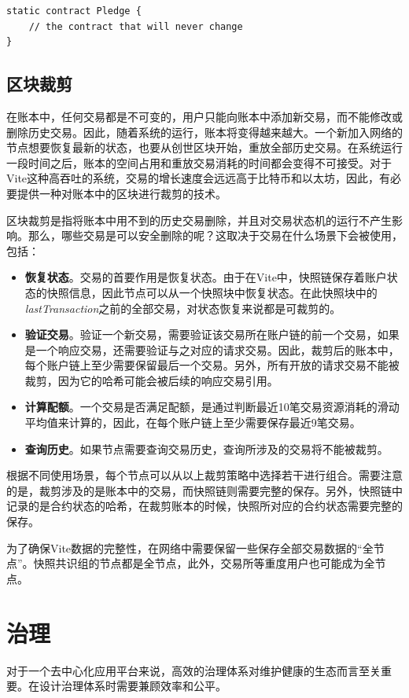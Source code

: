 \documentclass[UTF8,nofonts]{ctexart}
\begin{document}
\begin{multicols}{2}
\begin{verbatim}
static contract Pledge {
    // the contract that will never change
}
\end{verbatim}

\subsection{区块裁剪}
在账本中，任何交易都是不可变的，用户只能向账本中添加新交易，而不能修改或删除历史交易。因此，随着系统的运行，账本将变得越来越大。一个新加入网络的节点想要恢复最新的状态，也要从创世区块开始，重放全部历史交易。在系统运行一段时间之后，账本的空间占用和重放交易消耗的时间都会变得不可接受。对于Vite这种高吞吐的系统，交易的增长速度会远远高于比特币和以太坊，因此，有必要提供一种对账本中的区块进行裁剪的技术。

区块裁剪是指将账本中用不到的历史交易删除，并且对交易状态机的运行不产生影响。那么，哪些交易是可以安全删除的呢？这取决于交易在什么场景下会被使用，包括：

\begin{itemize}
\item \textbf{恢复状态}。交易的首要作用是恢复状态。由于在Vite中，快照链保存着账户状态的快照信息，因此节点可以从一个快照块中恢复状态。在此快照块中的\textit{lastTransaction}之前的全部交易，对状态恢复来说都是可裁剪的。
\item \textbf{验证交易}。验证一个新交易，需要验证该交易所在账户链的前一个交易，如果是一个响应交易，还需要验证与之对应的请求交易。因此，裁剪后的账本中，每个账户链上至少需要保留最后一个交易。另外，所有开放的请求交易不能被裁剪，因为它的哈希可能会被后续的响应交易引用。
\item \textbf{计算配额}。一个交易是否满足配额，是通过判断最近10笔交易资源消耗的滑动平均值来计算的，因此，在每个账户链上至少需要保存最近9笔交易。
\item \textbf{查询历史}。如果节点需要查询交易历史，查询所涉及的交易将不能被裁剪。
\end{itemize}

根据不同使用场景，每个节点可以从以上裁剪策略中选择若干进行组合。需要注意的是，裁剪涉及的是账本中的交易，而快照链则需要完整的保存。另外，快照链中记录的是合约状态的哈希，在裁剪账本的时候，快照所对应的合约状态需要完整的保存。

为了确保Vite数据的完整性，在网络中需要保留一些保存全部交易数据的“全节点”。快照共识组的节点都是全节点，此外，交易所等重度用户也可能成为全节点。

\section{治理}
对于一个去中心化应用平台来说，高效的治理体系对维护健康的生态而言至关重要。在设计治理体系时需要兼顾效率和公平。


\end{multicols}
\end{document}
